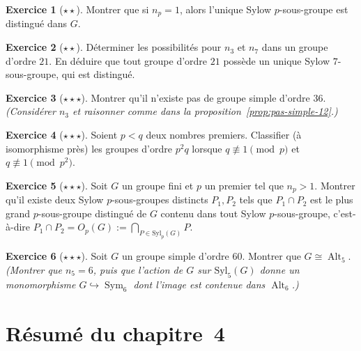 \documentclass[12pt,a4paper,openany]{book}
\theoremstyle{definition}
\newtheorem{exercice}{Exercice}[chapter]
\DeclareMathOperator{\Sym}{Sym}
\DeclareMathOperator{\Alt}{Alt}
\begin{document}
\begin{exercice}[$\star\star$]\label{exo:unique-sylow-normal}
  Montrer que si $n_p=1$, alors l'unique Sylow $p$-sous-groupe est
  distingué dans $G$.
\end{exercice}

\begin{exercice}[$\star\star$]\label{exo:sylow-21}
  Déterminer les possibilités pour $n_3$ et $n_7$ dans un groupe
  d'ordre $21$. En déduire que tout groupe d'ordre $21$ possède un
  unique Sylow $7$-sous-groupe, qui est distingué.
\end{exercice}

\begin{exercice}[$\star\star\star$]\label{exo:pas-simple-36}
  Montrer qu'il n'existe pas de groupe simple d'ordre $36$.
  \textit{(Considérer $n_3$ et raisonner comme dans la
  proposition~\ref{prop:pas-simple-12}.)}
\end{exercice}

\begin{exercice}[$\star\star\star$]\label{exo:classification-p2q}
  Soient $p<q$ deux nombres premiers. Classifier (à isomorphisme
  près) les groupes d'ordre $p^2 q$ lorsque $q\not\equiv 1\pmod{p}$
  et $q\not\equiv 1\pmod{p^2}$.
\end{exercice}

\begin{exercice}[$\star\star\star$]\label{exo:sylow-intersection}
  Soit $G$ un groupe fini et $p$ un premier tel que $n_p>1$. Montrer
  qu'il existe deux Sylow $p$-sous-groupes distincts $P_1,P_2$ tels
  que $P_1\cap P_2$ est le plus grand $p$-sous-groupe distingué de $G$
  contenu dans tout Sylow $p$-sous-groupe, c'est-à-dire
  $P_1\cap P_2 = O_p(G) := \bigcap_{P\in\mathrm{Syl}_p(G)} P$.
\end{exercice}

\begin{exercice}[$\star\star\star$]\label{exo:simple-60}
  Soit $G$ un groupe simple d'ordre $60$. Montrer que $G\cong\Alt_5$.
  \textit{(Montrer que $n_5=6$, puis que l'action de $G$ sur
  $\mathrm{Syl}_5(G)$ donne un monomorphisme $G\hookrightarrow\Sym_6$
  dont l'image est contenue dans $\Alt_6$.)}
\end{exercice}

\section*{Résumé du chapitre~4}
\end{document}
